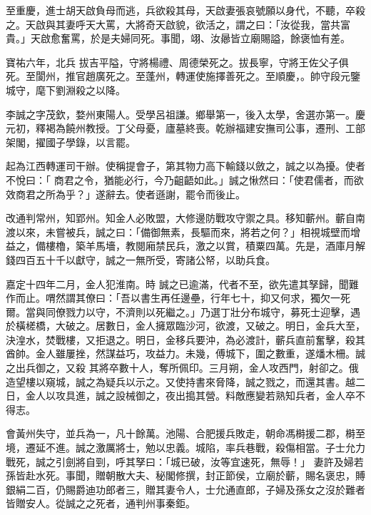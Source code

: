 \begin{pinyinscope}
 至重慶，進士胡天啟負母而逃，兵欲殺其母，天啟妻張哀號願以身代，不聽，卒殺之。天啟與其妻呼天大罵，大將奇天啟貌，欲活之，謂之曰：「汝從我，當共富貴。」天啟愈奮罵，於是夫婦同死。事聞，翊、汝曏皆立廟賜謚，餘褒恤有差。



 寶祐六年，北兵
 拔吉平隘，守將楊禮、周德榮死之。拔長寧，守將王佐父子俱死。至閬州，推官趙廣死之。至蓬州，轉運使施擇善死之。至順慶，。帥守段元鑒城守，麾下劉淵殺之以降。



 李誠之字茂欽，婺州東陽人。受學呂祖謙。鄉舉第一，後入太學，舍選亦第一。慶元初，釋褐為饒州教授。丁父母憂，廬墓終喪。乾辦福建安撫司公事，遷刑、工部架閣，擢國子學錄，以言罷。



 起為江西轉運司干辦。使稱提會子，第其物力高下輸錢以斂之，誠之以為擾。使者不悅曰：「
 商君之令，猶能必行，今乃齟齬如此。」誠之愀然曰：「使君儒者，而欲效商君之所為乎？」遂辭去。使者遜謝，罷令而後止。



 改通判常州，知郢州。知金人必敗盟，大修邊防戰攻守禦之具。移知蘄州。蘄自南渡以來，未嘗被兵，誠之曰：「備御無素，長驅而來，將若之何？」相視城壁而增益之，備樓櫓，築羊馬墻，教閱廂禁民兵，激之以賞，積粟四萬。先是，酒庫月解錢四百五十千以獻守，誠之一無所受，寄諸公帑，以助兵食。



 嘉定十四年二月，金人犯淮南。時
 誠之已逾滿，代者不至，欲先遣其孥歸，聞難作而止。喟然謂其僚曰：「吾以書生再任邊壘，行年七十，抑又何求，獨欠一死爾。當與同僚戮力以守，不濟則以死繼之。」乃選丁壯分布城守，募死士迎擊，遇於橫槎橋，大破之。居數日，金人擁眾臨沙河，欲渡，又破之。明日，金兵大至，決湟水，焚戰樓，又拒退之。明日，金移兵要沖，為必渡計，蘄兵直前奮擊，殺其酋帥。金人雖屢挫，然謀益巧，攻益力。未幾，傅城下，圍之數重，遂燔木柵。誠之出兵御之，又殺
 其將卒數十人，奪所佩印。三月朔，金人攻西門，射卻之。俄造望樓以窺城，誠之為疑兵以示之。又使持書來脅降，誠之戮之，而還其書。越二日，金人以攻具進，誠之設械御之，夜出搗其營。料敵應變若熟知兵者，金人卒不得志。



 會黃州失守，並兵為一，凡十餘萬。池陽、合肥援兵敗走，朝命馮榯援二郡，榯至境，遷延不進。誠之激厲將士，勉以忠義。城陷，率兵巷戰，殺傷相當。子士允力戰死，誠之引劍將自剄，呼其孥曰：「城已破，汝等宜速死，無辱！」
 妻許及婦若孫皆赴水死。事聞，贈朝散大夫、秘閣修撰，封正節侯，立廟於蘄，賜名褒忠，賻銀絹二百，仍賜爵迪功郎者三，贈其妻令人，士允通直郎，子婦及孫女之沒於難者皆贈安人。從誠之之死者，通判州事秦鉅。




\end{pinyinscope}
